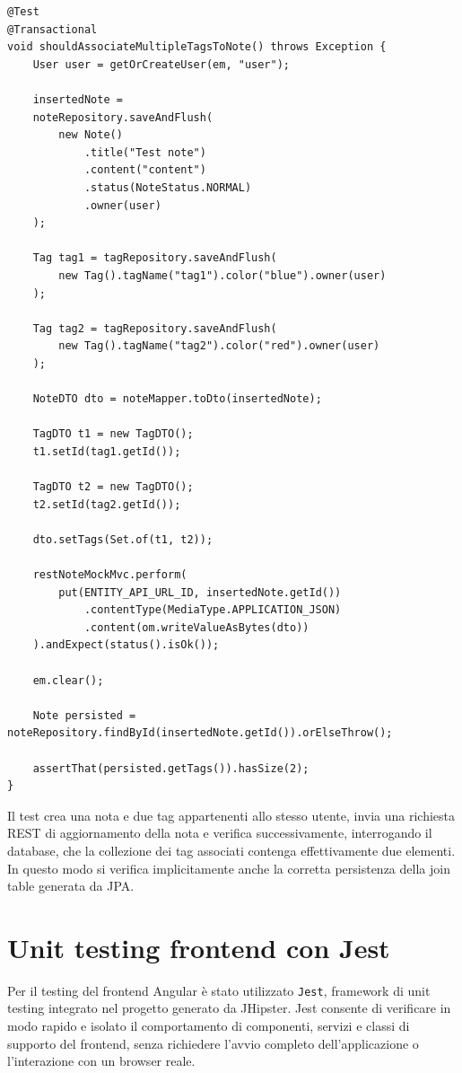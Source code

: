 \captionsetup{type=listing}
\label{lst:note-tag-association-test}
\begin{verbatim}
@Test
@Transactional
void shouldAssociateMultipleTagsToNote() throws Exception {
	User user = getOrCreateUser(em, "user");
	
	insertedNote =
	noteRepository.saveAndFlush(
		new Note()
			.title("Test note")
			.content("content")
			.status(NoteStatus.NORMAL)
			.owner(user)
	);
	
	Tag tag1 = tagRepository.saveAndFlush(
		new Tag().tagName("tag1").color("blue").owner(user)
	);
	
	Tag tag2 = tagRepository.saveAndFlush(
		new Tag().tagName("tag2").color("red").owner(user)
	);
	
	NoteDTO dto = noteMapper.toDto(insertedNote);
	
	TagDTO t1 = new TagDTO();
	t1.setId(tag1.getId());
	
	TagDTO t2 = new TagDTO();
	t2.setId(tag2.getId());
	
	dto.setTags(Set.of(t1, t2));
	
	restNoteMockMvc.perform(
		put(ENTITY_API_URL_ID, insertedNote.getId())
			.contentType(MediaType.APPLICATION_JSON)
			.content(om.writeValueAsBytes(dto))
	).andExpect(status().isOk());
	
	em.clear();
	
	Note persisted = noteRepository.findById(insertedNote.getId()).orElseThrow();
	
	assertThat(persisted.getTags()).hasSize(2);
}
\end{verbatim}

Il test crea una nota e due tag appartenenti allo stesso utente, invia una richiesta REST di aggiornamento della nota e verifica successivamente, interrogando il database, che la collezione dei tag associati contenga effettivamente due elementi. In questo modo si verifica implicitamente anche la corretta persistenza della join table generata da JPA.

\section{Unit testing frontend con Jest}
\label{sec:jest}

Per il testing del frontend Angular è stato utilizzato \texttt{Jest}, framework di unit testing integrato nel progetto generato da JHipster. Jest consente di verificare in modo rapido e isolato il comportamento di componenti, servizi e classi di supporto del frontend, senza richiedere l’avvio completo dell’applicazione o l’interazione con un browser reale.

